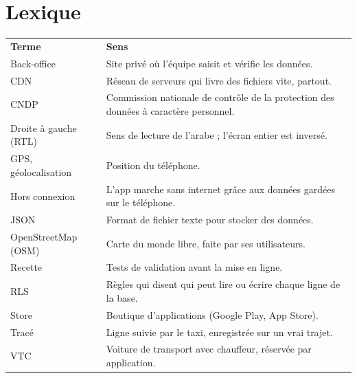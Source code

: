 \documentclass[11pt,a4paper]{article}
\newcommand{\hd}[1]{\textbf{\color{white}#1}}
\newcommand{\hdrow}{\rowcolor{brand}}
\renewcommand{\arraystretch}{1.35}
\begin{document}
\section{Lexique}
{\renewcommand{\arraystretch}{1.12}\small
\begin{xltabular}{\textwidth}{@{}l Y@{}}
\hdrow \hd{Terme} & \hd{Sens} \\
Back-office & Site privé où l'équipe saisit et vérifie les données. \\
CDN & Réseau de serveurs qui livre des fichiers vite, partout. \\
CNDP & Commission nationale de contrôle de la protection des données à caractère personnel. \\
Droite à gauche (RTL) & Sens de lecture de l'arabe ; l'écran entier est inversé. \\
GPS, géolocalisation & Position du téléphone. \\
Hors connexion & L'app marche sans internet grâce aux données gardées sur le téléphone. \\
JSON & Format de fichier texte pour stocker des données. \\
OpenStreetMap (OSM) & Carte du monde libre, faite par ses utilisateurs. \\
Recette & Tests de validation avant la mise en ligne. \\
RLS & Règles qui disent qui peut lire ou écrire chaque ligne de la base. \\
Store & Boutique d'applications (Google Play, App Store). \\
Tracé & Ligne suivie par le taxi, enregistrée sur un vrai trajet. \\
VTC & Voiture de transport avec chauffeur, réservée par application. \\
\end{xltabular}}
\end{document}
